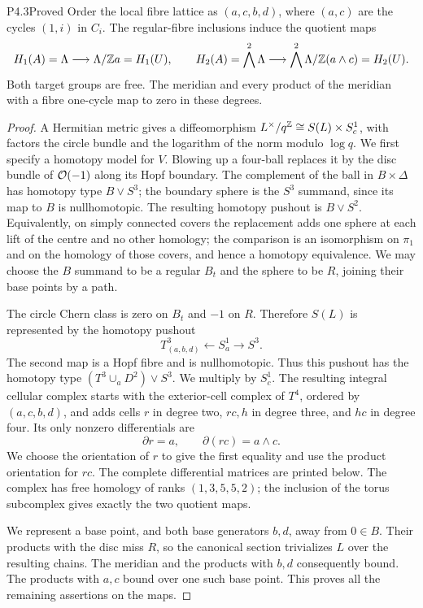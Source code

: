\begin{statement}{P4.3}{Proved}
Order the local fibre lattice as $(a,c,b,d)$, where $(a,c)$ are the cycles
$(1,i)$ in $C_i$. The regular-fibre inclusions induce the quotient maps
\[
 H_1(A)=\Lambda\longrightarrow\Lambda/\mathbb Z a=H_1(U),\qquad
 H_2(A)=\bigwedge^2\Lambda\longrightarrow
 \bigwedge^2\Lambda/\mathbb Z(a\wedge c)=H_2(U).
\]
Both target groups are free. The meridian and every product of the
meridian with a fibre one-cycle map to zero in these degrees.
\end{statement}
\begin{proof}
A Hermitian metric gives a diffeomorphism
$L^\times/q^\mathbb Z\cong S(L)\times S^1_c$, with factors the circle bundle and
the logarithm of the norm modulo $\log q$. We first specify a homotopy
model for $V$. Blowing up a four-ball replaces it by the disc bundle of
$\mathcal O(-1)$ along its Hopf boundary. The complement of the ball in
$B\times\Delta$ has homotopy type $B\vee S^3$; the boundary sphere is
the $S^3$ summand, since its map to $B$ is nullhomotopic. The resulting
homotopy pushout is $B\vee S^2$. Equivalently, on simply connected
covers the replacement adds one sphere at each lift of the centre and
no other homology; the comparison is an isomorphism on $\pi_1$ and on
the homology of those covers, and hence a homotopy equivalence. We may
choose the $B$ summand to be a regular $B_t$ and the sphere to be $R$,
joining their base points by a path.

The circle Chern class is zero on $B_t$ and $-1$ on $R$. Therefore
$S(L)$ is represented by the homotopy pushout
\[
 T^3_{(a,b,d)}\longleftarrow S^1_a\longrightarrow S^3.
\]
The second map is a Hopf fibre and is nullhomotopic. Thus this pushout
has the homotopy type $(T^3\cup_aD^2)\vee S^3$. We multiply by $S^1_c$.
The resulting integral cellular complex starts with the exterior-cell
complex of $T^4$, ordered by $(a,c,b,d)$, and adds cells $r$ in degree
two, $rc,h$ in degree three, and $hc$ in degree four. Its only nonzero
differentials are
\[
 \partial r=a,\qquad \partial(rc)=a\wedge c.
\]
We choose the orientation of $r$ to give the first equality and use the
product orientation for $rc$. The complete differential matrices are
printed below. The complex has free homology of ranks $(1,3,5,5,2)$;
the inclusion of the torus subcomplex gives exactly the two quotient maps.

We represent a base point, and both base generators $b,d$, away from
$0\in B$. Their products with the disc miss $R$, so the canonical section
trivializes $L$ over the resulting chains. The meridian and the products
with $b,d$ consequently bound. The products with $a,c$ bound over one
such base point. This proves all the remaining assertions on the maps.
\end{proof}

